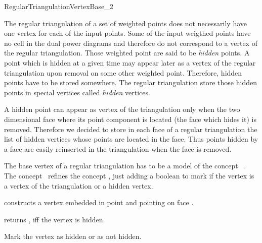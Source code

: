 

\begin{ccRefConcept}{RegularTriangulationVertexBase_2}


\ccDefinition
  
The regular triangulation of a set of weighted points does not
necessarily
have one vertex for each of the input points. Some of the input
weigthed points have no cell in the dual power diagrams
and therefore do not correspond to a vertex of the regular
triangulation.
Those weighted point are said to be {\it hidden} points.
A  point which is hidden at a given time may appear later as a vertex of
the regular triangulation upon removal on some other weighted point.
Therefore, hidden points have to be stored somewhere.
The regular triangulation store those hidden points
in special vertices called {\it hidden} vertices.

A hidden point can appear as vertex of the triangulation
only when the
two dimensional face where its point component is located
(the face which hides it)
is removed. Therefore we decided to store 
in each  face of a regular triangulation
the list of hidden vertices whose points are located in the face.
Thus  points hidden by a face are easily reinserted in the triangulation
when the face is removed.

The base vertex of a regular triangulation has to be a model
of the concept \ccRefName\ .
The concept \ccRefName\ refines the concept 
 ,
just adding a boolean to mark if the vertex is a 
vertex of the triangulation or a hidden vertex.

\ccRefines

\ccCreation
{}  %

\ccGlue
{}
{constructs a vertex embedded in point  and pointing on face .}


{returns , iff the vertex is hidden.}

{Mark the vertex as hidden or as not hidden.}


\ccHasModels
{}

\ccSeeAlso
{}

\end{ccRefConcept}


